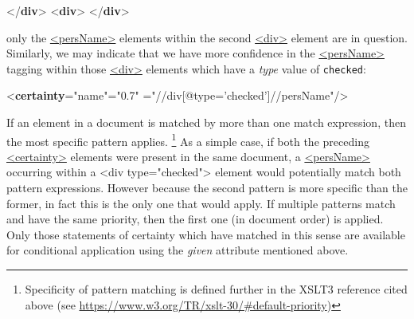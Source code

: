 \begin{shaded}
{</\textbf{div}>}\mbox{}\newline 
{<\textbf{div}>}\mbox{}\newline 
{}\mbox{}\newline 
{</\textbf{div}>}\end{shaded}\egroup\par \noindent  only the \hyperref[TEI.persName]{<persName>} elements within the second \hyperref[TEI.div]{<div>} element are in question. Similarly, we may indicate that we have more confidence in the \hyperref[TEI.persName]{<persName>} tagging within those \hyperref[TEI.div]{<div>} elements which have a {\itshape type} value of \texttt{checked}: \par\bgroup{}\exampleFont \begin{shaded}\noindent\mbox{}{<\textbf{certainty}\hspace*{1em}{locus}="{name}"\hspace*{1em}{degree}="{0.7}"\mbox{}\newline 
\hspace*{1em}{match}="{//div[@type='checked']//persName}"/>}\end{shaded}\egroup\par \noindent  If an element in a document is matched by more than one match expression, then the most specific pattern applies. \footnote{Specificity of pattern matching is defined further in the XSLT3 reference cited above (see \url{https://www.w3.org/TR/xslt-30/\#default-priority})} As a simple case, if both the preceding \hyperref[TEI.certainty]{<certainty>} elements were present in the same document, a \hyperref[TEI.persName]{<persName>} occurring within a <div type="checked"> element would potentially match both pattern expressions. However because the second pattern is more specific than the former, in fact this is the only one that would apply. If multiple patterns match and have the same priority, then the first one (in document order) is applied. Only those statements of certainty which have matched in this sense are available for conditional application using the {\itshape given} attribute mentioned above.\par
